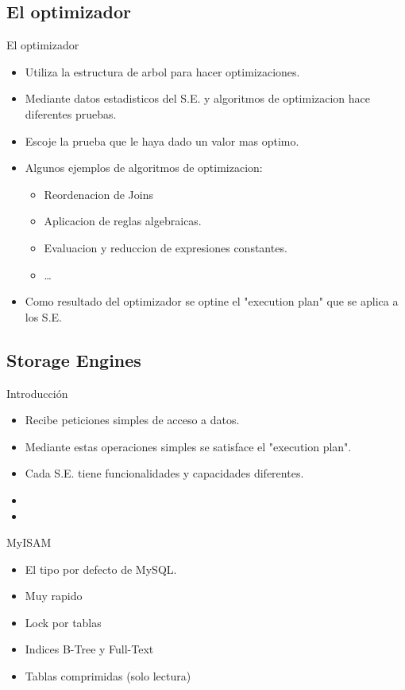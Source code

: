 \subsection{El optimizador}
\begin{frame}{El optimizador}
  \begin{itemize}
    \item Utiliza la estructura de arbol para hacer optimizaciones.
    \item Mediante datos estadisticos del S.E. y algoritmos de optimizacion hace diferentes pruebas.
    \item Escoje la prueba que le haya dado un valor mas optimo.
    \item Algunos ejemplos de algoritmos de optimizacion:
    \begin{itemize}
      \item Reordenacion de Joins
      \item Aplicacion de reglas algebraicas.
      \item Evaluacion y reduccion de expresiones constantes.
      \item \dots
    \end{itemize}
    \item Como resultado del optimizador se optine el "execution plan" que se aplica a los S.E.
  \end{itemize}
\end{frame}

\subsection{Storage Engines}
\begin{frame}{Introducción}
  \begin{itemize}
    \item Recibe peticiones simples de acceso a datos.
    \item Mediante estas operaciones simples se satisface el "execution plan".
    \item Cada S.E. tiene funcionalidades y capacidades diferentes.
    \item 
    \item 
  \end{itemize}
\end{frame}

\begin{frame}{MyISAM}
  \begin{itemize}
    \item El tipo por defecto de MySQL.
    \item Muy rapido
    \item Lock por tablas
    \item Indices B-Tree y Full-Text
    \item Tablas comprimidas (solo lectura)
  \end{itemize}
\end{frame}

